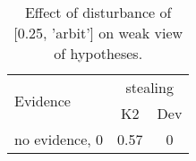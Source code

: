 \begin{table}\begin{tabular}{l|cc}\toprule\multirow{2}{*}{Evidence} & \multicolumn{2}{c}{stealing}\\& {K2} & {Dev}\\\midrule
no evidence, 0 & \cellcolor{Bittersweet}0.57&\cellcolor{Bittersweet}0\\\bottomrule\end{tabular}\caption{Effect of disturbance of [0.25, 'arbit'] on weak view of hypotheses.}\end{table}